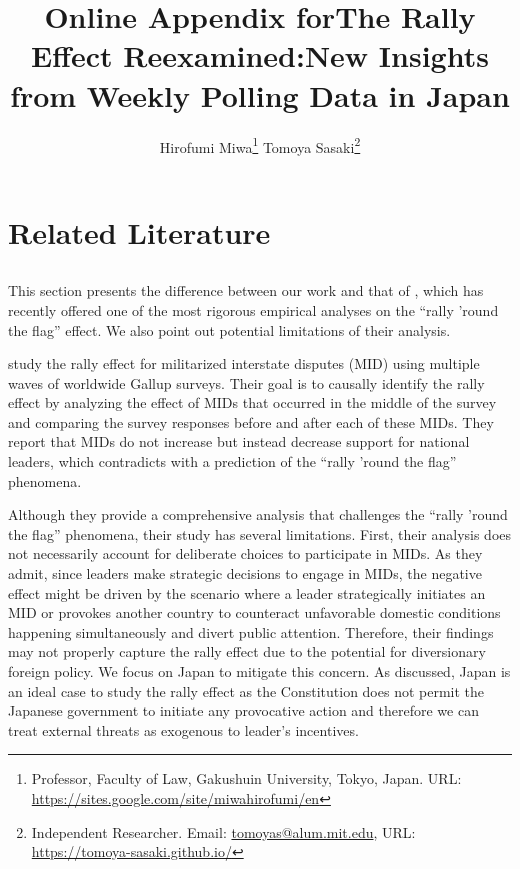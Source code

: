 \documentclass[12pt,letterpaper]{scrartcl}
\title{\textbf{\textsf{\LARGE Online Appendix for\linebreak The Rally Effect Reexamined:\linebreak New Insights from Weekly Polling Data in Japan}}}
\author{
  \if0\blind
  \hspace{1.5in}
  Hirofumi Miwa\thanks{Professor, Faculty of Law, Gakushuin University,
  Tokyo, Japan. URL: \href{https://sites.google.com/site/miwahirofumi/en}{https://sites.google.com/site/miwahirofumi/en}}
  \hspace{.7in}
  Tomoya Sasaki\thanks{Independent Researcher. Email:
  \href{mailto:tomoyas@alum.mit.edu}{tomoyas@alum.mit.edu},
  URL: \href{https://tomoya-sasaki.github.io/}{https://tomoya-sasaki.github.io/}}
  \fi
}
\date{}
\begin{document}
\begin{titlepage}
\maketitle
\setcounter{tocdepth}{2}
\tableofcontents
\thispagestyle{empty}
\end{titlepage}


\normalsize
\doublespacing
\section{Related Literature}\label{app:sec:literature}

\subsection{\citet{seo2023}}\label{app:subsec:seo2023}

This section presents the difference between our work and that of \citet{seo2023}, which has recently offered one of the most rigorous empirical analyses on the ``rally 'round the flag'' effect. We also point out potential limitations of their analysis.

\citet{seo2023} study the rally effect for militarized interstate disputes (MID) using multiple waves of worldwide Gallup surveys. Their goal is to causally identify the rally effect by analyzing the effect of MIDs that occurred in the middle of the survey and comparing the survey responses before and after each of these MIDs. They report that MIDs do not increase but instead decrease support for national leaders, which contradicts with a prediction of the ``rally 'round the flag'' phenomena.

Although they provide a comprehensive analysis that challenges the ``rally 'round the flag'' phenomena, their study has several limitations. First, their analysis does not necessarily account for deliberate choices to participate in MIDs. As they admit, since leaders make strategic decisions to engage in MIDs, the negative effect might be driven by the scenario where a leader strategically initiates an MID or provokes another country to counteract unfavorable domestic conditions happening simultaneously and divert public attention. Therefore, their findings may not properly capture the rally effect due to the potential for diversionary foreign policy. We focus on Japan to mitigate this concern. As discussed, Japan is an ideal case to study the rally effect as the Constitution does not permit the Japanese government to initiate any provocative action and therefore we can treat external threats as exogenous to leader's incentives.
\end{document}
